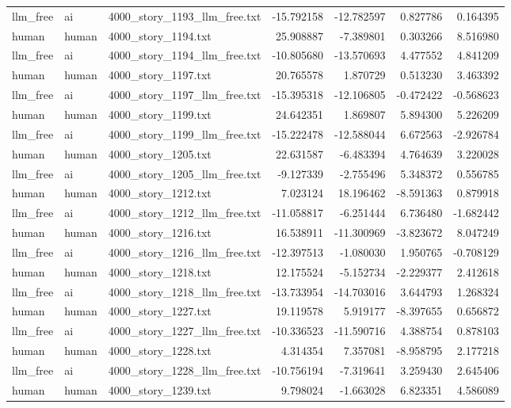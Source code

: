 \begin{longtable}{lllrrrr}
llm\_free & ai & 4000\_story\_1193\_llm\_free.txt & -15.792158 & -12.782597 & 0.827786 & 0.164395 \\
human & human & 4000\_story\_1194.txt & 25.908887 & -7.389801 & 0.303266 & 8.516980 \\
llm\_free & ai & 4000\_story\_1194\_llm\_free.txt & -10.805680 & -13.570693 & 4.477552 & 4.841209 \\
human & human & 4000\_story\_1197.txt & 20.765578 & 1.870729 & 0.513230 & 3.463392 \\
llm\_free & ai & 4000\_story\_1197\_llm\_free.txt & -15.395318 & -12.106805 & -0.472422 & -0.568623 \\
human & human & 4000\_story\_1199.txt & 24.642351 & 1.869807 & 5.894300 & 5.226209 \\
llm\_free & ai & 4000\_story\_1199\_llm\_free.txt & -15.222478 & -12.588044 & 6.672563 & -2.926784 \\
human & human & 4000\_story\_1205.txt & 22.631587 & -6.483394 & 4.764639 & 3.220028 \\
llm\_free & ai & 4000\_story\_1205\_llm\_free.txt & -9.127339 & -2.755496 & 5.348372 & 0.556785 \\
human & human & 4000\_story\_1212.txt & 7.023124 & 18.196462 & -8.591363 & 0.879918 \\
llm\_free & ai & 4000\_story\_1212\_llm\_free.txt & -11.058817 & -6.251444 & 6.736480 & -1.682442 \\
human & human & 4000\_story\_1216.txt & 16.538911 & -11.300969 & -3.823672 & 8.047249 \\
llm\_free & ai & 4000\_story\_1216\_llm\_free.txt & -12.397513 & -1.080030 & 1.950765 & -0.708129 \\
human & human & 4000\_story\_1218.txt & 12.175524 & -5.152734 & -2.229377 & 2.412618 \\
llm\_free & ai & 4000\_story\_1218\_llm\_free.txt & -13.733954 & -14.703016 & 3.644793 & 1.268324 \\
human & human & 4000\_story\_1227.txt & 19.119578 & 5.919177 & -8.397655 & 0.656872 \\
llm\_free & ai & 4000\_story\_1227\_llm\_free.txt & -10.336523 & -11.590716 & 4.388754 & 0.878103 \\
human & human & 4000\_story\_1228.txt & 4.314354 & 7.357081 & -8.958795 & 2.177218 \\
llm\_free & ai & 4000\_story\_1228\_llm\_free.txt & -10.756194 & -7.319641 & 3.259430 & 2.645406 \\
human & human & 4000\_story\_1239.txt & 9.798024 & -1.663028 & 6.823351 & 4.586089 \\

\end{longtable}
